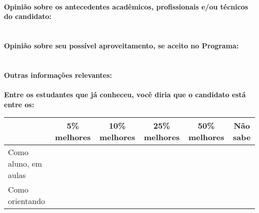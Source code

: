 \documentclass[11pt]{article}
\begin{document}
\\
\textbf{Opinião sobre os antecedentes acadêmicos, profissionais e/ou técnicos do candidato:}
\\\\
\\
\textbf{Opinião sobre seu possível aproveitamento, se aceito no Programa:}
\\\\ 
\\
\textbf{Outras informações relevantes:} \\
\\[0.3cm]
\textbf{Entre os estudantes que já conheceu, você diria que o candidato está entre os:}
\\
\begin{tabular}{|l|c|c|c|c|c|}
\hline
 & 5\% melhores & 10\% melhores & 25\% melhores & 50\% melhores & Não sabe \\
\hline
Como aluno, em aulas &  &  &  &  & \\
\hline
Como orientando &  &  &  &  & \\
\hline
\end{tabular}
\end{document}
